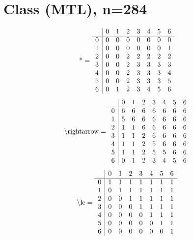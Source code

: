 \documentclass[11pt]{article}
\begin{document}
\section{Class (MTL), n=284}
\[\text{*} = 
\begin{array}{r | r r r r r r r}
 & 0 & 1 & 2 & 3 & 4 & 5 & 6 \\ \hline
0 & 0 & 0 & 0 & 0 & 0 & 0 & 0 \\
1 & 0 & 0 & 0 & 0 & 0 & 0 & 1 \\
2 & 0 & 0 & 2 & 2 & 2 & 2 & 2 \\
3 & 0 & 0 & 2 & 3 & 3 & 3 & 3 \\
4 & 0 & 0 & 2 & 3 & 3 & 3 & 4 \\
5 & 0 & 0 & 2 & 3 & 3 & 3 & 5 \\
6 & 0 & 1 & 2 & 3 & 4 & 5 & 6 \\
\end{array}
\]
\[\text{\textbackslash rightarrow} = 
\begin{array}{r | r r r r r r r}
 & 0 & 1 & 2 & 3 & 4 & 5 & 6 \\ \hline
0 & 6 & 6 & 6 & 6 & 6 & 6 & 6 \\
1 & 5 & 6 & 6 & 6 & 6 & 6 & 6 \\
2 & 1 & 1 & 6 & 6 & 6 & 6 & 6 \\
3 & 1 & 1 & 2 & 6 & 6 & 6 & 6 \\
4 & 1 & 1 & 2 & 5 & 6 & 6 & 6 \\
5 & 1 & 1 & 2 & 5 & 5 & 6 & 6 \\
6 & 0 & 1 & 2 & 3 & 4 & 5 & 6 \\
\end{array}
\]
\[\text{\textbackslash le} = 
\begin{array}{r | r r r r r r r}
 & 0 & 1 & 2 & 3 & 4 & 5 & 6 \\ \hline
0 & 1 & 1 & 1 & 1 & 1 & 1 & 1 \\
1 & 0 & 1 & 1 & 1 & 1 & 1 & 1 \\
2 & 0 & 0 & 1 & 1 & 1 & 1 & 1 \\
3 & 0 & 0 & 0 & 1 & 1 & 1 & 1 \\
4 & 0 & 0 & 0 & 0 & 1 & 1 & 1 \\
5 & 0 & 0 & 0 & 0 & 0 & 1 & 1 \\
6 & 0 & 0 & 0 & 0 & 0 & 0 & 1 \\
\end{array}
\]
\end{document}
